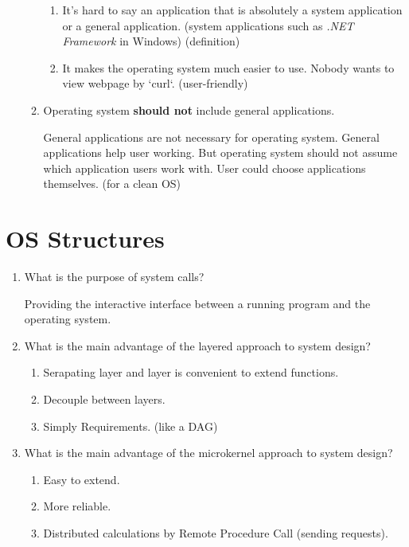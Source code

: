 \begin{enumerate}
\begin{enumerate}
        \begin{enumerate}
            \item It's hard to say an application that is absolutely a system application or a general application. (system applications such as \textit{.NET Framework} in Windows) (definition)
    
            \item It makes the operating system much easier to use. Nobody wants to view webpage by `curl`. (user-friendly)
    
        \end{enumerate}
        
        \item Operating system \textbf{should not} include general applications.
        
        General applications are not necessary for operating system. General applications help user working. But operating system should not assume which application users work with. User could choose applications themselves. (for a clean OS)        
    \end{enumerate}

\end{enumerate}

\chapter{OS Structures}

\begin{enumerate}
    \item What is the purpose of system calls?
    
    Providing the interactive interface between a running program and the operating system.

    \item What is the main advantage of the layered approach to system design?
    
    \begin{enumerate}
        \item Serapating layer and layer is convenient to extend functions.
        \item Decouple between layers.
        \item Simply Requirements. (like a DAG)
    \end{enumerate}

    \item What is the main advantage of the microkernel approach to system design?
    
    \begin{enumerate}
        \item Easy to extend.
        \item More reliable.
        \item Distributed calculations by Remote Procedure Call (sending requests).
    \end{enumerate}
    
\end{enumerate}

